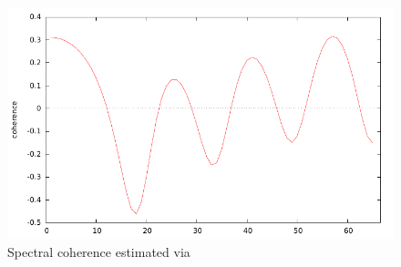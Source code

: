 \begin{figure}[htbp]
  \centering
  \includegraphics{figures/coherence}
  \caption{Spectral coherence estimated via }
  \label{fig:coherence}
\end{figure}


